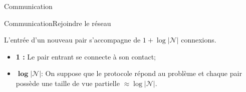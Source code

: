 \begin{frame}{Communication}{\SPRAY}

\end{frame}


\begin{frame}{Communication}{Rejoindre le réseau}

  L'entrée d'un nouveau pair s'accompagne de $1+ \log {|\mathcal{N}|}$
  connexions.

  \vspace{0.5cm}
  
  \begin{itemize}
  \item \textbf{1 :} Le pair entrant se connecte à son contact;
  \item $\pmb{\log |\mathcal{N}|}$: On suppose que le protocole répond au
    problème et chaque pair possède une taille de vue partielle
    $\approx \log |\mathcal{N}|$.
  \end{itemize}

  \vspace{1cm}

  \begin{minipage}{0.32\textwidth}
    \begin{center}
      
    \end{center}
  \end{minipage}
  \begin{minipage}{0.32\textwidth}
    \begin{center}
      
    \end{center}
  \end{minipage}
  \begin{minipage}{0.32\textwidth}
    \begin{center}
      
    \end{center}
  \end{minipage}




\end{frame}
